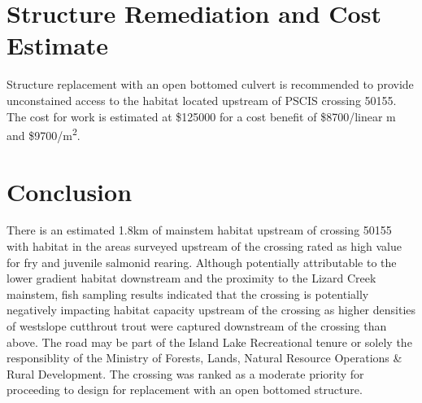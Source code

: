 \documentclass[
]{book}
\begin{document}
\hypertarget{structure-remediation-and-cost-estimate}{%
\section*{Structure Remediation and Cost Estimate}\label{structure-remediation-and-cost-estimate}}

Structure replacement with an open bottomed culvert is recommended to provide unconstained access to the habitat located upstream of PSCIS crossing 50155. The cost for work is estimated at \$125000 for a cost benefit of \$8700/linear m and \$9700/m\textsuperscript{2}.

\hypertarget{conclusion-1}{%
\section*{Conclusion}\label{conclusion-1}}

There is an estimated 1.8km of mainstem habitat upstream of crossing 50155 with habitat in the areas surveyed upstream of the crossing rated as high value for fry and juvenile salmonid rearing. Although potentially attributable to the lower gradient habitat downstream and the proximity to the Lizard Creek mainstem, fish sampling results indicated that the crossing is potentially negatively impacting habitat capacity upstream of the crossing as higher densities of westslope cutthrout trout were captured downstream of the crossing than above. The road may be part of the Island Lake Recreational tenure or solely the responsiblity of the Ministry of Forests, Lands, Natural Resource Operations \& Rural Development. The crossing was ranked as a moderate priority for proceeding to design for replacement with an open bottomed structure.
\end{document}
